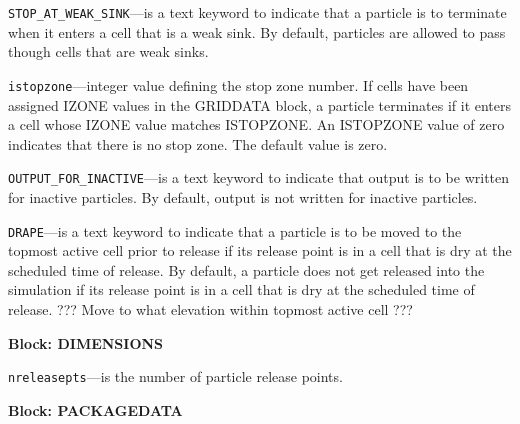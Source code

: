 \begin{description}
\item \texttt{STOP\_AT\_WEAK\_SINK}---is a text keyword to indicate that a particle is to terminate when it enters a cell that is a weak sink.  By default, particles are allowed to pass though cells that are weak sinks.

\item \texttt{istopzone}---integer value defining the stop zone number.  If cells have been assigned IZONE values in the GRIDDATA block, a particle terminates if it enters a cell whose IZONE value matches ISTOPZONE.  An ISTOPZONE value of zero indicates that there is no stop zone.  The default value is zero.

\item \texttt{OUTPUT\_FOR\_INACTIVE}---is a text keyword to indicate that output is to be written for inactive particles.  By default, output is not written for inactive particles.

\item \texttt{DRAPE}---is a text keyword to indicate that a particle is to be moved to the topmost active cell prior to release if its release point is in a cell that is dry at the scheduled time of release.  By default, a particle does not get released into the simulation if its release point is in a cell that is dry at the scheduled time of release.  ??? Move to what elevation within topmost active cell ???

\end{description}
\item \textbf{Block: DIMENSIONS}

\begin{description}
\item \texttt{nreleasepts}---is the number of particle release points.

\end{description}
\item \textbf{Block: PACKAGEDATA}

